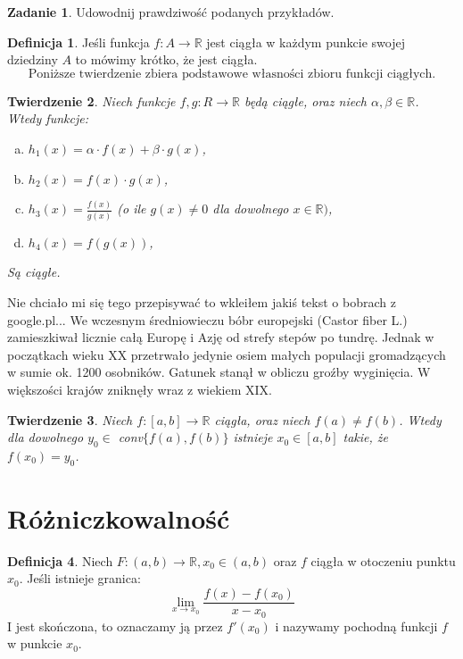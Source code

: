 \documentclass[12pt,a4paper]{article}
\newtheorem{tw}{Twierdzenie}[section]
\theoremstyle{definition}
\newtheorem{df}[tw]{Definicja}
\newtheorem{zad}{Zadanie}
\begin{document}
\begin{zad}
Udowodnij prawdziwość podanych przykładów.
\end{zad}

\begin{df}
Jeśli funkcja $f: A \rightarrow  \mathbb{R}$ jest ciągła w każdym punkcie swojej dziedziny $A$ to mówimy krótko, że jest ciągła.
\[ \mbox{Poniższe twierdzenie zbiera podstawowe własności zbioru funkcji ciągłych.} \]
\end{df}

\begin{tw}
Niech funkcje $f, g: R \rightarrow  \mathbb{R}$ będą ciągłe, oraz niech $\alpha , \beta  \in  \mathbb{R}$. Wtedy funkcje:
\begin{enumerate}[a)]
\item $h_1(x) = \alpha  \cdot  f(x) + \beta  \cdot  g(x)$,
\item $h_2(x) = f(x) \cdot  g(x)$,
\item $h_3(x) = \frac{f(x)}{g(x)}$ (o ile $g(x) \ne  0$ dla dowolnego $x \in \mathbb{R})$,
\item $h_4(x) = f(g(x))$,
\end{enumerate}
Są ciągłe.
\end{tw}

Nie chciało mi się tego przepisywać to wkleiłem jakiś tekst o bobrach z google.pl... We wczesnym średniowieczu bóbr europejski (Castor fiber L.) zamieszkiwał licznie całą Europę i Azję od strefy stepów po tundrę. Jednak w początkach wieku XX przetrwało jedynie osiem małych populacji gromadzących w sumie ok. 1200 osobników. Gatunek stanął w obliczu groźby wyginięcia. W większości krajów zniknęły wraz z wiekiem XIX.

\begin{tw}
Niech $f: [a,b] \rightarrow  \mathbb{R}$ ciągła, oraz niech $f(a) \ne  f(b)$. Wtedy dla dowolnego $y_0 \in $ conv$\{f(a),f(b)\}$ istnieje $x_0 \in  [a,b]$ takie, że $f(x_0) = y_0$.
\end{tw}

\section{Różniczkowalność}

\begin{df}
Niech $F: (a,b) \rightarrow  \mathbb{R}, x_0 \in  (a,b)$ oraz $f$ ciągła w otoczeniu punktu $x_0$. Jeśli istnieje granica:
\[ \lim_{x\rightarrow x_0} \frac{f(x) - f(x_0)}{x - x_0} \]
I jest skończona, to oznaczamy ją przez $f'(x_0)$ i nazywamy pochodną funkcji $f$ w punkcie $x_0$.
\end{df}
\end{document}
